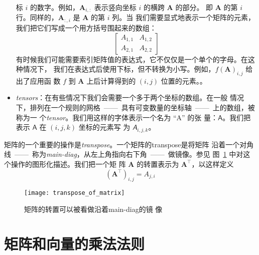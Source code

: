 \begin{itemize}
  标 $i$ 的数字。例如，$\pmb{A}_{i,:}$ 表示竖向坐标 $i$ 的横跨 $\pmb{A}$ 的部分。
  即 $\pmb{A}$ 的第 $i$ 行。同样的，$\pmb{A}_{:,i}$ 是 $\pmb{A}$ 的第 $i$ 列。当
  我们需要显式地表示一个矩阵的元素，我们把它们写成一个用方括号围起来的数组：
  \begin{equation}
    \begin{bmatrix}A_{1,1} & A_{1,2} \\ A_{2,1} & A_{2,2}\end{bmatrix}
    \label{eq:matrix_example}
  \end{equation}
  有时候我们可能需要索引矩阵值的表达式，它不仅仅是一个单个的字母。在这种情况下，
  我们在表达式后使用下标，但不转换为小写。例如，$f(\pmb{A})_{i,j}$ 给出了应用函
  数 $f$ 到 $\pmb{A}$ 上后计算得到的 $(i,j)$ 位置的元素。。
\item \emph{\gls{tensors}}：在有些情况下我们会需要一个多于两个坐标的数组。在一般
  情况下，排列在一个规则的网格~——~具有可变数量的坐标轴~——~上的数组，被称为一
  个\emph{\gls{tensor}}。我们用这样的字体表示一个名为 ``A'' 的张
  量：$\pmb{\mathsf{A}}$。我们把表示 $\pmb{\mathsf{A}}$ 在 $(i,j,k)$ 坐标的元素写
  为 $\mathsfit{A}_{i,j,k}$。
\end{itemize}

矩阵的一个重要的操作是\emph{\gls{transpose}}。一个矩阵的\gls*{transpose}是将矩阵
沿着一个对角线~——~称为\emph{\gls{main-diag}}，从左上角指向右下角~——~做镜像。参见
图~\ref{fig:transpose_of_matrix} 中对这个操作的图形化描述。我们把一个矩
阵 $\pmb{A}$ 的转置表示为 $\pmb{A}^{\top}$，以这样定义
\begin{equation}
  (\pmb{A}^{\top})_{i,j} = A_{j,i}
  \label{eq:transpose_of_matrix}
\end{equation}

\begin{figure}[h]
  \centering
  \texttt{[image: transpose\_of\_matrix]}
  \caption{矩阵的转置可以被看做沿着\gls*{main-diag}的镜
    像\label{fig:transpose_of_matrix}}
\end{figure}

\section{矩阵和向量的乘法法则}
\label{sec:multiplying_matrices_and_vectors}

